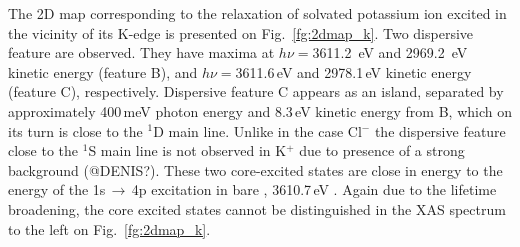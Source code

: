 The 2D map corresponding to the relaxation of solvated potassium ion excited in the vicinity of its K-edge is presented on Fig.\ \ref{fg:2dmap_k}. Two dispersive feature are observed. They have maxima at $h\nu = $3611.2 \,eV and 2969.2 \,eV kinetic energy (feature B), and $h\nu = $3611.6\,eV and 2978.1\,eV kinetic energy (feature C), respectively. Dispersive feature C appears as an island, separated by approximately 400\,meV photon energy and 8.3\,eV kinetic energy from B, which on its turn is close to the $^1$D main line. Unlike in the case Cl$^{-}$ the dispersive feature close to the $^1$S main line is not observed in K$^{+}$ due to presence of a strong {\color{red}background (@DENIS?)}. These two core-excited states are close in energy to the energy of the 1s$\,\rightarrow\,$4p excitation in bare \ki, 3610.7\,eV \citep{hertlein06:062715}. Again due to the lifetime broadening, the core excited states cannot be distinguished in the XAS spectrum to the left on Fig.\ \ref{fg:2dmap_k}.